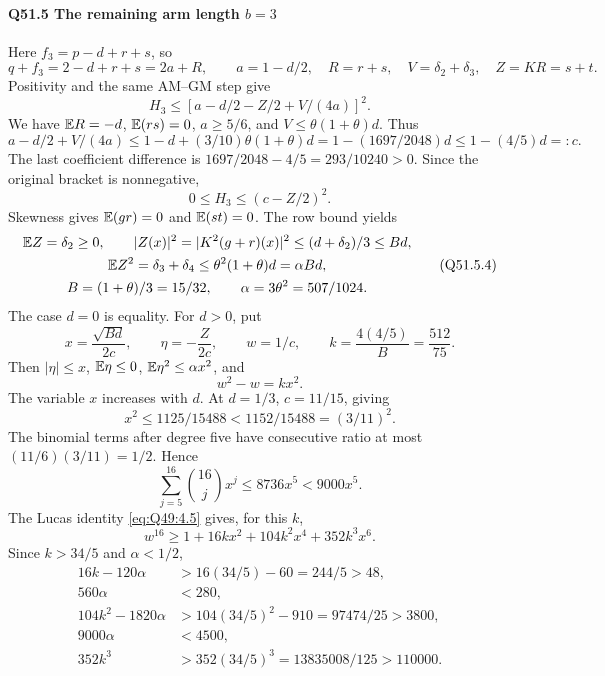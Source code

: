 \paragraph{Q51.5 The remaining arm length $b=\allowbreak 3$}
Here \(f_3=\allowbreak p-d+r+s\), so
\[
q+f_3=2-d+r+s=2a+R,\qquad
a=1-d/2,\quad R=r+s,\quad V=\delta_2+\delta_3,\quad Z=KR=s+t.
\]
Positivity and the same AM--GM step give
\[
H_3\le[a-d/2-Z/2+V/(4a)]^2.
\tag{Q51.5.1}\label{eq:Q51:5.1}
\]
We have \(\mathbb E R=\allowbreak -d\), \(\mathbb E(rs)=\allowbreak 0\), \(a\ge\allowbreak 5/6\), and
\(V\le\allowbreak \theta(1+\theta)d\). Thus
\[
a-d/2+V/(4a)
\le1-d+(3/10)\theta(1+\theta)d
=1-(1697/2048)d
\le1-(4/5)d=:c.
\tag{Q51.5.2}\label{eq:Q51:5.2}
\]
The last coefficient difference is \(1697/2048-4/5=\allowbreak 293/10240>\allowbreak 0\).
Since the original bracket is nonnegative,
\[
0\le H_3\le(c-Z/2)^2.
\tag{Q51.5.3}\label{eq:Q51:5.3}
\]
Skewness gives \(\mathbb E(gr)=\allowbreak 0\) and \(\mathbb E(st)=\allowbreak 0\). The row bound yields
\[
\begin{gathered}
\mathbb E Z=\delta_2\ge0,\qquad
|Z(x)|^2=|K^2(g+r)(x)|^2\le(d+\delta_2)/3\le Bd,\\
\mathbb E Z^2=\delta_3+\delta_4
\le\theta^2(1+\theta)d=\alpha Bd,\\
B=(1+\theta)/3=15/32,\qquad \alpha=3\theta^2=507/1024.
\end{gathered}
\tag{Q51.5.4}\label{eq:Q51:5.4}
\]
The case \(d=\allowbreak 0\) is equality. For \(d>\allowbreak 0\), put
\[
x=\frac{\sqrt{Bd}}{2c},\qquad
\eta=-\frac Z{2c},\qquad w=1/c,\qquad
k=\frac{4(4/5)}B=\frac{512}{75}.
\]
Then \(|\eta|\le\allowbreak  x\), \(\mathbb E\eta\le\allowbreak 0\), \(\mathbb E\eta^2\le\allowbreak \alpha x^2\), and
\[
w^2-w=kx^2.
\tag{Q51.5.5}\label{eq:Q51:5.5}
\]
The variable \(x\) increases with \(d\). At \(d=\allowbreak 1/3\), \(c=\allowbreak 11/15\), giving
\[
x^2\le1125/15488<1152/15488=(3/11)^2.
\tag{Q51.5.6}\label{eq:Q51:5.6}
\]
The binomial terms after degree five have consecutive ratio at most
\((11/6)(3/11)=\allowbreak 1/2\). Hence
\[
\sum_{j=5}^{16}\binom{16}{j}x^j\le8736x^5<9000x^5.
\tag{Q51.5.7}\label{eq:Q51:5.7}
\]
The Lucas identity \eqref{eq:Q49:4.5} gives, for this \(k\),
\[
w^{16}\ge1+16kx^2+104k^2x^4+352k^3x^6.
\tag{Q51.5.8}\label{eq:Q51:5.8}
\]
Since \(k>\allowbreak 34/5\) and \(\alpha<\allowbreak 1/2\),
\[
\begin{aligned}
16k-120\alpha&>16(34/5)-60=244/5>48,\\
560\alpha&<280,\\
104k^2-1820\alpha&>104(34/5)^2-910=97474/25>3800,\\
9000\alpha&<4500,\\
352k^3&>352(34/5)^3=13835008/125>110000.
\end{aligned}
\]
